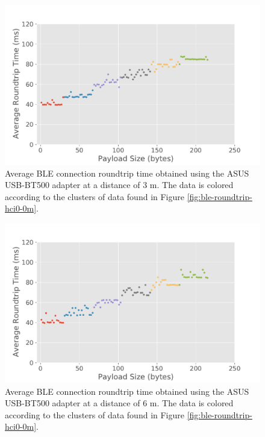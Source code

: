 \begin{figure}[H]
    \centering
    \includegraphics[width=0.75\linewidth]{images/ble-roundtrip-hci0-300cm.pdf}
    \caption[Average \acs{BLE} connection roundtrip time obtained using the ASUS USB-BT500 adapter at a distance of 3 m.]{Average \acs{BLE} connection roundtrip time obtained using the ASUS USB-BT500 adapter at a distance of $3\text{ m}$. The data is colored according to the clusters of data found in Figure \ref{fig:ble-roundtrip-hci0-0m}.}
    \label{fig:ble-roundtrip-hci0-3m}
\end{figure}

\begin{figure}[H]
    \centering
    \includegraphics[width=0.75\linewidth]{images/ble-roundtrip-hci0-600cm.pdf}
    \caption[Average \acs{BLE} connection roundtrip time obtained using the ASUS USB-BT500 adapter at a distance of 6 m.]{Average \acs{BLE} connection roundtrip time obtained using the ASUS USB-BT500 adapter at a distance of $6\text{ m}$. The data is colored according to the clusters of data found in Figure \ref{fig:ble-roundtrip-hci0-0m}.}
    \label{fig:ble-roundtrip-hci0-6m}
\end{figure}

